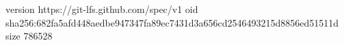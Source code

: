 version https://git-lfs.github.com/spec/v1
oid sha256:682fa5afd448aedbe947347fa89ec7431d3a656cd2546493215d8856ed51511d
size 786528
